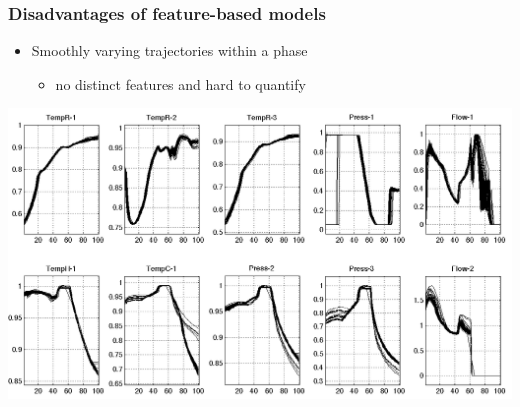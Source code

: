 \begin{frame}\frametitle{Disadvantages of feature-based models}

\begin{itemize}
	\item	Smoothly varying trajectories within a phase
	
			\begin{itemize}
				\item	no distinct features and hard to quantify
			\end{itemize}

\end{itemize}

\begin{center}
	\includegraphics[width=\textwidth]{images/smooth-trajectories-unsuitable-for-features.png}
\end{center}

\end{frame}

